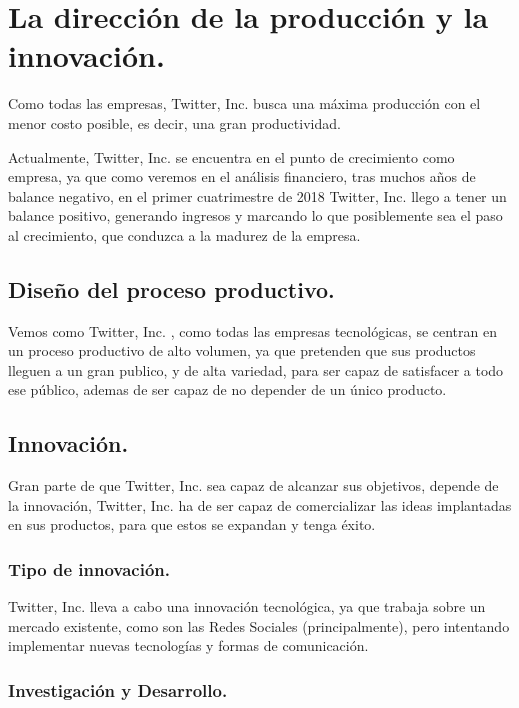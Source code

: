 \newpage


\section{La dirección de la producción y la innovación.}

Como todas las empresas, Twitter, Inc. busca una máxima producción con el menor costo posible, es decir, una gran productividad.

Actualmente, Twitter, Inc. se encuentra en el punto de crecimiento como empresa, ya que como veremos en el análisis financiero, tras muchos años de balance negativo, en el primer cuatrimestre de 2018 Twitter, Inc. llego a tener un balance positivo, generando ingresos y marcando lo que posiblemente sea el paso al crecimiento, que conduzca a la madurez de la empresa.

\subsection{Diseño del proceso productivo.}

Vemos como Twitter, Inc. , como todas las empresas tecnológicas, se centran en un proceso productivo de alto volumen, ya que pretenden que sus productos lleguen a un gran publico, y de alta variedad, para ser capaz de satisfacer a todo ese público, ademas de ser capaz de no depender de un único producto.

\subsection{Innovación.}

Gran parte de que Twitter, Inc. sea capaz de alcanzar sus objetivos, depende de la innovación, Twitter, Inc. ha de ser capaz de comercializar las ideas implantadas en sus productos, para que estos se expandan y tenga éxito.

\subsubsection{Tipo de innovación.}

Twitter, Inc. lleva a cabo una innovación tecnológica, ya que trabaja sobre un mercado existente, como son las Redes Sociales (principalmente), pero intentando implementar nuevas tecnologías y formas de comunicación.

\subsubsection{Investigación y Desarrollo.}

